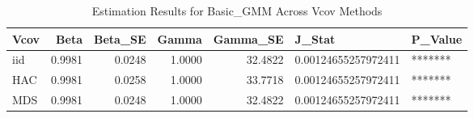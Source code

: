 \begin{table}[ht]
\centering
\begin{tabular}{lrrrrll}
  \hline
Vcov & Beta & Beta\_SE & Gamma & Gamma\_SE & J\_Stat & P\_Value \\ 
  \hline
iid & 0.9981 & 0.0248 & 1.0000 & 32.4822 & 0.00124655257972411 & ******* \\ 
  HAC & 0.9981 & 0.0258 & 1.0000 & 33.7718 & 0.00124655257972411 & ******* \\ 
  MDS & 0.9981 & 0.0248 & 1.0000 & 32.4822 & 0.00124655257972411 & ******* \\ 
   \hline
\end{tabular}
\caption{Estimation Results for Basic_GMM Across Vcov Methods} 
\label{tab:basicgmm}
\end{table}
